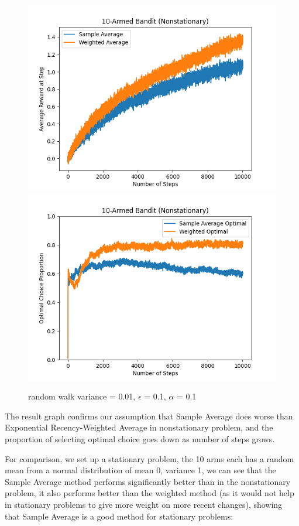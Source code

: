 \documentclass{article}
\begin{document}
\begin{figure}[h!]
\centering
\includegraphics[scale=.6]{RL_A1_pics/dif_arms/num_steps=10000, num_experiments=1000, arms=10, var=1, rand_walk_var=0.01, alpha=0.1, epsilon=0.1.png}
\includegraphics[scale=.6]{RL_A1_pics/dif_arms/optimal/10.png}
\caption{random walk variance = 0.01, $\epsilon$ = 0.1, $\alpha$ = 0.1}
\label{fig:10-Armed1}
\end{figure}

The result graph confirms our assumption that Sample Average does worse than Exponential Recency-Weighted Average in nonstationary problem, and the proportion of selecting optimal choice goes down as number of steps grows.

For comparison, we set up a stationary problem, the 10 arms each has a random mean from a normal distribution of mean 0, variance 1, we can see that the Sample Average method performs significantly better than in the nonstationary problem, it also performs better than the weighted method (as it would not help in stationary problems to give more weight on more recent changes), showing that Sample Average is a good method for stationary problems:
\end{document}
